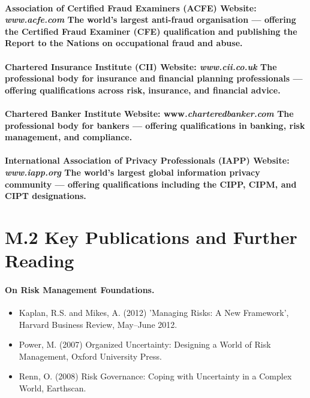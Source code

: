 \paragraph{\textbf{Association of Certified Fraud Examiners (ACFE)} Website: \textit{www.acfe.com} The world's largest anti-fraud organisation — offering the Certified Fraud Examiner (CFE) qualification and publishing the Report to the Nations on occupational fraud and abuse.}
\paragraph{\textbf{Chartered Insurance Institute (CII)} Website: \textit{www.cii.co.uk} The professional body for insurance and financial planning professionals — offering qualifications across risk, insurance, and financial advice.}
\paragraph{\textbf{Chartered Banker Institute} Website: www\textit{.charteredbanker.com} The professional body for bankers — offering qualifications in banking, risk management, and compliance.}
\paragraph{\textbf{International Association of Privacy Professionals (IAPP)} Website: \textit{www.iapp.org} The world's largest global information privacy community — offering qualifications including the CIPP, CIPM, and CIPT designations.}

\section*{M.2 Key Publications and Further Reading}
\paragraph{\textbf{On Risk Management Foundations}.}
\begin{itemize}
  \item{Kaplan, R.S. and Mikes, A. (2012) 'Managing Risks: A New Framework', Harvard Business Review, May–June 2012.}
  \item{Power, M. (2007) Organized Uncertainty: Designing a World of Risk Management, Oxford University Press.}
  \item{Renn, O. (2008) Risk Governance: Coping with Uncertainty in a Complex World, Earthscan.}
\end{itemize}

